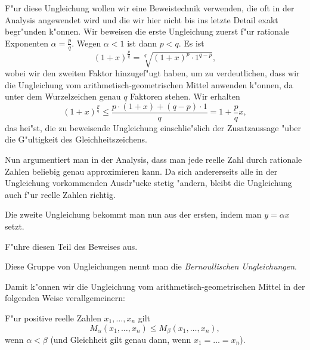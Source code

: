 \documentclass[11pt]{article}
\begin{document}
\begin{beweis} F"ur diese Ungleichung wollen wir eine Beweistechnik verwenden,
  die oft in der Analysis angewendet wird und die wir hier nicht bis ins
  letzte Detail exakt begr"unden k"onnen. Wir beweisen die erste Ungleichung
  zuerst f"ur rationale Exponenten $\alpha=\frac{p}{q}$. Wegen $\alpha<1$ ist
  dann $p<q$. Es ist
\[(1+x)^\frac{p}{q}=\sqrt[q]{(1+x)^{p}\cdot 1^{q-p}},\]
wobei wir den zweiten Faktor hinzugef"ugt haben, um zu verdeutlichen, dass wir
die Ungleichung vom arithmetisch-geometrischen Mittel anwenden k"onnen, da
unter dem Wurzelzeichen genau $q$ Faktoren stehen. Wir erhalten
\[(1+x)^\frac{p}{q}\leq \frac{p\cdot (1+x)+(q-p)\cdot 1}{q} = 1+\frac{p}{q}x,\]
das hei"st, die zu beweisende Ungleichung einschlie"slich der Zusatzaussage
"uber die G"ultigkeit des Gleichheitszeichens.

Nun argumentiert man in der Analysis, dass man jede reelle Zahl durch
rationale Zahlen beliebig genau approximieren kann. Da sich andererseits alle
in der Ungleichung vorkommenden Ausdr"ucke stetig "andern, bleibt die
Ungleichung auch f"ur reelle Zahlen richtig.

Die zweite Ungleichung bekommt man nun aus der ersten, indem man $y=\alpha x$
setzt.
\end{beweis}

\begin{aufgabe} F"uhre diesen Teil des Beweises aus.
\end{aufgabe}

Diese Gruppe von Ungleichungen nennt man die {\em Bernoullischen
  Ungleichungen}. \medskip

Damit k"onnen wir die Ungleichung vom arithmetisch-geometrischen Mittel in der
folgenden Weise verallgemeinern:
\begin{satz} 
  F"ur positive reelle Zahlen $x_{1},\ldots,x_{n}$ gilt
\[M_{\alpha}(x_{1},\ldots,x_{n})\leq M_{\beta}(x_{1},\ldots,x_{n}),\]
wenn $\alpha < \beta$ (und Gleichheit gilt genau dann, wenn $x_{1}=\ldots =
x_{n}$). 
\end{satz}
\end{document}
